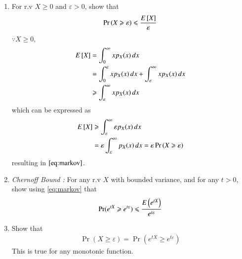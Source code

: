 \documentclass[journal,12pt,twocolumn]{IEEEtran}
\renewcommand\thesection{\arabic{section}}
\begin{document}
\begin{enumerate}[label=\thesection.\arabic*,ref=\thesection.\theenumi]
\item For r.v $X \ge 0$ and $\varepsilon> 0$, show that 
\begin{align}
\label{eq:markov}
\Pr\left(X \geqslant \varepsilon\right) \leqslant\frac{E{}\left[X\right]}{\varepsilon}
 \end{align}
\solution $\because X \geqslant 0$, 
\begin{align}
E{}\left[X\right]&=\int_{0}^{\infty} x p_X(x)\,dx
\\
&=\int_{0}^{\varepsilon} x p_X(x)\,dx +\int_{\varepsilon}^{\infty}x p_X(x)\,dx
\\
&\geqslant \int_{\varepsilon}^{\infty}x p_X(x)\,dx 
\end{align}
which can be expressed as
\begin{align}
E{}\left[X\right] &\geqslant \int_{\varepsilon}^{\infty}\varepsilon p_X(x)\,dx
\\
& = \varepsilon \int_{\varepsilon}^{\infty} p_X(x)\,dx
 = \varepsilon \Pr\left(X \geqslant \varepsilon\right)
\end{align}
resulting in $\eqref{eq:markov}$.
\item {\em Chernoff Bound :} For any r.v $X$ with bounded variance, and for any $t >0$, show using \eqref{eq:markov} that %
\begin{align}
\label{eq:chernoff}
\Pr(e^{tX}\geqslant e^{t\varepsilon})\leqslant \frac{E\left(e^{tX}\right)}{e^{t\varepsilon}}
\end{align}
\item Show that 
\begin{align}
\label{eq:markov_chernoff}
\Pr(X\geqslant \varepsilon) = \Pr(e^{tX}\geqslant e^{t\varepsilon})
\end{align}
\solution This is true for any monotonic function.  
\end{enumerate}
\end{document}
